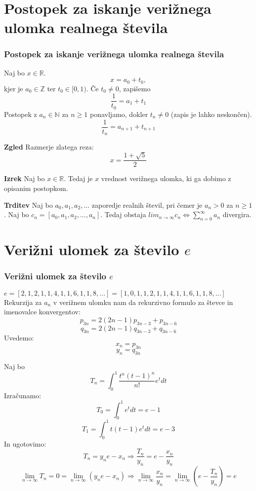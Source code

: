 \documentclass{beamer}
\newcommand{\N}{\mathbb{N}}
\newcommand{\R}{\mathbb{R}}
\newcommand{\Z}{\mathbb{Z}}
\newenvironment{iz}{\begin{block}{\textbf{Izrek}}}{\end{block}}
\newenvironment{zg}{\begin{block}{\textbf{Zgled}}}{\end{block}}
\newenvironment{trd}{\begin{block}{\textbf{Trditev}}}{\end{block}}
\begin{document}
\section{Postopek za iskanje verižnega ulomka realnega števila}

\begin{frame}
\frametitle{Postopek za iskanje verižnega ulomka realnega števila}
Naj bo $x \in \R$. \pause
\[ x = a_0+t_0, \]
kjer je $a_0 \in \Z$ ter $t_0 \in [0,1)$. \pause
Če $t_0 \neq 0$, zapišemo \[ \frac{1}{t_0} = a_1 + t_1 \] \pause
Postopek z $a_n \in \N$ za $n \geq 1$ ponavljamo, dokler $t_n \neq 0$ (zapis je lahko neskončen).
\[ \frac{1}{t_n} = a_{n+1}+t_{n+1} \]  \pause
	\begin{zg}
	Razmerje zlatega reza: \[x = \frac{1+\sqrt{5}}{2} \]
	\end{zg}
\end{frame}

\begin{frame}
	\begin{iz}
	Naj bo $x \in \R$. Tedaj je $x$ vrednost verižnega ulomka, ki ga dobimo z opisanim postopkom.
	\end{iz} \pause
	\begin{trd}
	Naj bo $a_0, a_1, a_2, ...$ zaporedje realnih števil, pri čemer je $a_n > 0$ za $n\geq1$. Naj bo $c_n = [a_0, a_1, a_2, ..., a_n]$. Tedaj obstaja $lim_{n\to\infty}c_n \Leftrightarrow \sum_{n=0}^{\infty}a_n$ divergira.
	\end{trd}
\end{frame}

\section{Verižni ulomek za število $e$}

\begin{frame}
\frametitle{Verižni ulomek za število $e$}
	$e = [2, 1, 2, 1, 1, 4, 1, 1, 6, 1, 1, 8, ...] = [1, 0, 1, 1, 2, 1, 1, 4, 1, 1, 6, 1, 1, 8, ...]$
	Rekurzija za $a_n$ v verižnem ulomku nam da rekurzivno formulo za števce in imenovalce konvergentov:
	\[ p_{3n} = 2(2n-1)p_{3n-3}+p_{3n-6} \]
	\[ q_{3n} = 2(2n-1)q_{3n-3}+q_{3n-6} \]
	Uvedemo: $$x_n = p_{3n}$$ $$y_n=q_{3n}$$
\end{frame}

\begin{frame}
Naj bo $$T_n = \int_{0}^{1}\frac{t^n(t-1)^n}{n!}e^t dt$$   \pause
Izračunamo:
$$T_0 = \int_{0}^{1}e^t dt = e -1$$
$$T_1 = \int_{0}^{1}t(t-1)e^t dt=e-3$$    \pause
In ugotovimo:$$T_n=y_n e-x_n\Rightarrow \frac{T_n}{y_n}=e-\frac{x_n}{y_n}$$    \pause
$$\lim_{n\to\infty}T_n=0=\lim_{n\to\infty}(y_ne-x_n) \Rightarrow \lim_{n\to\infty}\frac{x_n}{y_n}=\lim_{n\to\infty}(e-\frac{T_n}{y_n}) =e$$
\end{frame}
\end{document}
